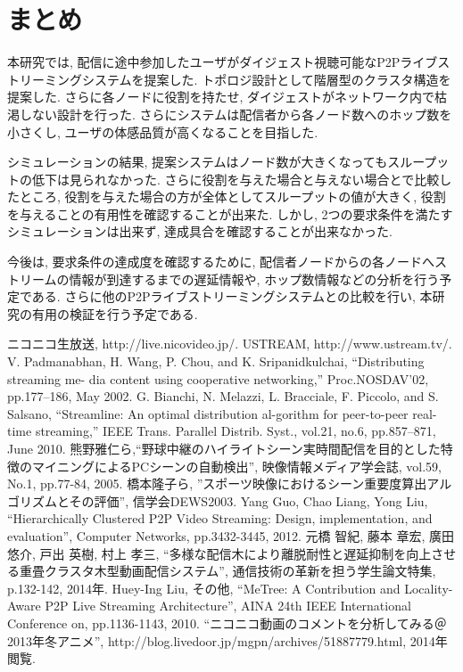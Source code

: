 \documentclass[letter]{ieicej}
\begin{document}
\section{まとめ}
本研究では, 配信に途中参加したユーザがダイジェスト視聴可能なP2Pライブストリーミングシステムを提案した. トポロジ設計として階層型のクラスタ構造を提案した. さらに各ノードに役割を持たせ, ダイジェストがネットワーク内で枯渇しない設計を行った. さらにシステムは配信者から各ノード数へのホップ数を小さくし, ユーザの体感品質が高くなることを目指した.

シミュレーションの結果, 提案システムはノード数が大きくなってもスループットの低下は見られなかった. さらに役割を与えた場合と与えない場合とで比較したところ, 役割を与えた場合の方が全体としてスループットの値が大きく, 役割を与えることの有用性を確認することが出来た. しかし, 2つの要求条件を満たすシミュレーションは出来ず, 達成具合を確認することが出来なかった.

今後は, 要求条件の達成度を確認するために, 配信者ノードからの各ノードへストリームの情報が到達するまでの遅延情報や, ホップ数情報などの分析を行う予定である. さらに他のP2Pライブストリーミングシステムとの比較を行い, 本研究の有用の検証を行う予定である.


\ack %

%
%
\begin{thebibliography}{99}

ニコニコ生放送, http://live.nicovideo.jp/.
USTREAM, http://www.ustream.tv/.
V. Padmanabhan, H. Wang, P. Chou, and K. Sripanidkulchai, “Distributing streaming me-
dia content using cooperative networking,” Proc.NOSDAV’02, pp.177–186, May 2002.
G. Bianchi, N. Melazzi, L. Bracciale, F. Piccolo, and S. Salsano, “Streamline: An optimal distribution al-gorithm for peer-to-peer real-time streaming,” IEEE Trans. Parallel Distrib. Syst., vol.21, no.6, pp.857–871, June 2010.
熊野雅仁ら,“野球中継のハイライトシーン実時間配信を目的とした特徴のマイニングによるPCシーンの自動検出”, 映像情報メディア学会誌, vol.59, No.1, pp.77-84, 2005.
橋本隆子ら, ”スポーツ映像におけるシーン重要度算出アルゴリズムとその評価”, 信学会DEWS2003.
 Yang Guo, Chao Liang, Yong Liu, “Hierarchically Clustered P2P Video Streaming: Design, implementation, and evaluation”, Computer Networks, pp.3432-3445, 2012.
 元橋 智紀, 藤本 章宏, 廣田 悠介, 戸出 英樹, 村上 孝三, “多様な配信木により離脱耐性と遅延抑制を向上させる重畳クラスタ木型動画配信システム”, 通信技術の革新を担う学生論文特集, p.132-142, 2014年.
 Huey-Ing Liu, その他, “MeTree: A Contribution and Locality-Aware P2P Live Streaming Architecture”, AINA 24th IEEE International Conference on, pp.1136-1143, 2010.
 “ニコニコ動画のコメントを分析してみる＠2013年冬アニメ”, http://blog.livedoor.jp/mgpn/archives/51887779.html, 2014年閲覧.


\end{thebibliography}


\appendix
\section{}
\end{document}
